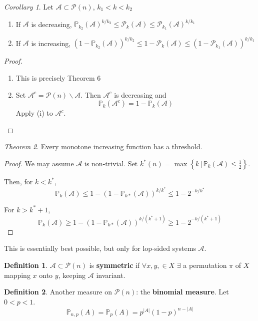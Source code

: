 \documentclass[a4paper]{article}
\theoremstyle{definition}
\newtheorem*{definition}{Definition}
\theoremstyle{remark}
\theoremstyle{default}
\newtheorem{theorem}{Theorem}
\newtheorem{corollary}[theorem]{Corollary}
\newcommand*\abs[1]{\left|#1\right|}
\begin{document}
\begin{corollary}
	Let $\mathcal{A} \subset \mathcal{P}(n)$, $k_1 < k < k_2$
	\begin{enumerate}[label=\roman*.]
		\item If $\mathcal{A}$ is decreasing,
		$\mathbb{P}_{k_2}(\mathcal{A})^{k/k_2} \leq \mathcal{P}_k(\mathcal{A}) \leq \mathcal{P}_{k_1}(\mathcal{A})^{k/k_1}$
		\item If $\mathcal{A}$ is increasing,
		$(1-\mathbb{P}_{k_2}(\mathcal{A}))^{k/k_2} \leq 1-\mathcal{P}_k(\mathcal{A}) \leq (1-\mathcal{P}_{k_1}(\mathcal{A}))^{k/k_1}$
	\end{enumerate}
\end{corollary}
\begin{proof}
	\begin{enumerate}[label=\roman*.]
		\item This is precisely Theorem 6
		\item Set $\mathcal{A}^c = \mathcal{P}(n)\backslash\mathcal{A}$.
		Then $\mathcal{A}^c$ is decreasing and
		$$\mathbb{P}_k(\mathcal{A}^c) = 1 - \mathbb{P}_k(\mathcal{A})$$
		Apply (i) to $\mathcal{A}^c$.
	\end{enumerate}
\end{proof}

\begin{theorem}
	Every monotone increasing function has a threshold.
\end{theorem}
\begin{proof}
	We may assume $\mathcal{A}$ is non-trivial.
	Set $k^*(n) = \max \left\{k \,|\, \mathbb{P}_k(\mathcal{A}) \leq \frac{1}{2}\right\}$.
	
	Then, for $k < k^*$,
	$$\mathbb{P}_k(\mathcal{A}) \leq 1-(1-\mathbb{P}_{k*}(\mathcal{A}))^{k/k^*} \leq 1-2^{-k/k^*}$$
	
	For $k > k^*+1$,
	$$\mathbb{P}_k(\mathcal{A}) \geq 1-(1-\mathbb{P}_{k*}(\mathcal{A}))^{k/(k^*+1)} \geq 1-2^{-k/(k^*+1)}$$
\end{proof}

This is essentially best possible, but only for lop-sided systems $\mathcal{A}$.

\begin{definition}
	$\mathcal{A} \subset \mathcal{P}(n)$ is \textbf{symmetric} if
	$\forall x,y, \in X$ $\exists$ a permutation $\pi$ of $X$ mapping $x$ onto $y$,
	keeping $\mathcal{A}$ invariant.
\end{definition}

\begin{definition}
	Another measure on $\mathcal{P}(n)$: the \textbf{binomial measure}.
	Let $0<p<1$.
	$$\mathbb{P}_{n,p}(A) = \mathbb{P}_p(A) = p^{\abs{A}}(1-p)^{n-\abs{A}}$$
\end{definition}
\end{document}
